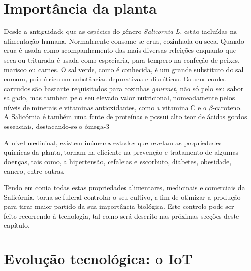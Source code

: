 \section{Importância da planta}



Desde a antiguidade que as espécies do género \textit{Salicornia L.} estão incluídas na alimentação humana. Normalmente consome-se crua, cozinhada ou seca. Quando crua é usada como acompanhamento das mais diversas refeições enquanto que seca ou triturada é usada como especiaria, para tempero na confeção de peixes, marisco ou carnes. O sal verde, como é conhecida, é um grande substituto do sal comum, pois é rico em substâncias depurativas e diuréticas. Os seus caules carnudos são bastante requisitados para cozinhas \textit{gourmet}, não só pelo seu sabor salgado, mas também pelo seu elevado valor nutricional\cite{Filomena2009}, nomeadamente pelos níveis de minerais e vitaminas antioxidantes, como a  vitamina C e o $\beta$-caroteno. A Salicórnia é também uma fonte de proteínas e possui alto teor de ácidos gordos essenciais, destacando-se o  ómega-3\cite{Ventura2011}. 

A nível medicinal, existem inúmeros estudos que revelam as propriedades químicas da planta, tornam-na eficiente na prevenção e tratamento de algumas doenças, tais como, a hipertensão, cefaleias e escorbuto, diabetes, obesidade, cancro, entre outras\cite{Wang2012}.

Tendo em conta todas estas propriedades alimentares, medicinais e comerciais da Salicórnia, torna-se fulcral controlar o seu cultivo, a fim de otimizar a produção para tirar maior partido da sua importância biológica. Este controlo pode ser feito recorrendo à tecnologia, tal como será descrito nas próximas secções deste capítulo. 




















\section{Evolução tecnológica: o \acl{IoT}}


